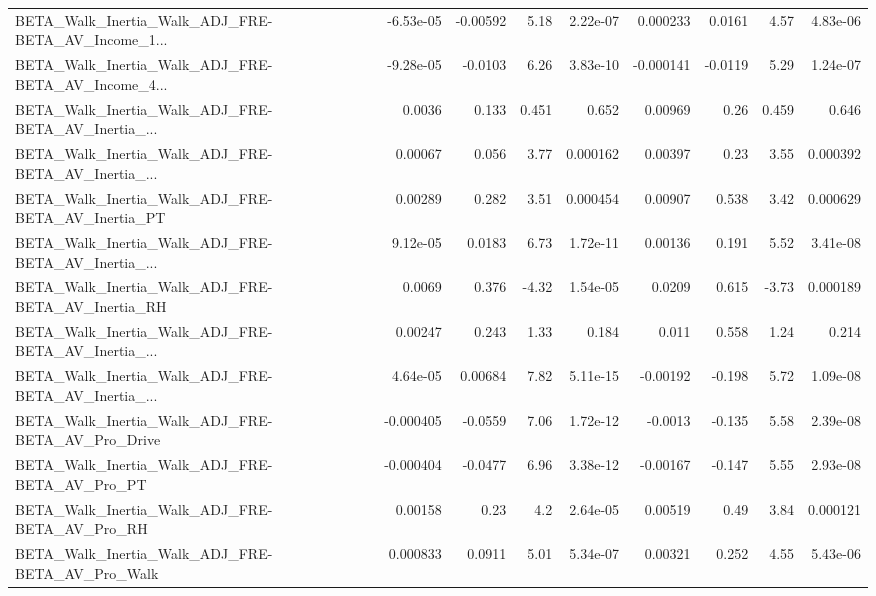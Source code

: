 \begin{tabular}{lrrrrrrrr}
BETA\_Walk\_Inertia\_Walk\_ADJ\_FRE-BETA\_AV\_Income\_1... &   -6.53e-05 &     -0.00592 &     5.18 & 2.22e-07 &   0.000233 &      0.0161 &         4.57 &      4.83e-06 \\
BETA\_Walk\_Inertia\_Walk\_ADJ\_FRE-BETA\_AV\_Income\_4... &   -9.28e-05 &      -0.0103 &     6.26 & 3.83e-10 &  -0.000141 &     -0.0119 &         5.29 &      1.24e-07 \\
BETA\_Walk\_Inertia\_Walk\_ADJ\_FRE-BETA\_AV\_Inertia\_... &      0.0036 &        0.133 &    0.451 &    0.652 &    0.00969 &        0.26 &        0.459 &         0.646 \\
BETA\_Walk\_Inertia\_Walk\_ADJ\_FRE-BETA\_AV\_Inertia\_... &     0.00067 &        0.056 &     3.77 & 0.000162 &    0.00397 &        0.23 &         3.55 &      0.000392 \\
BETA\_Walk\_Inertia\_Walk\_ADJ\_FRE-BETA\_AV\_Inertia\_PT  &     0.00289 &        0.282 &     3.51 & 0.000454 &    0.00907 &       0.538 &         3.42 &      0.000629 \\
BETA\_Walk\_Inertia\_Walk\_ADJ\_FRE-BETA\_AV\_Inertia\_... &    9.12e-05 &       0.0183 &     6.73 & 1.72e-11 &    0.00136 &       0.191 &         5.52 &      3.41e-08 \\
BETA\_Walk\_Inertia\_Walk\_ADJ\_FRE-BETA\_AV\_Inertia\_RH  &      0.0069 &        0.376 &    -4.32 & 1.54e-05 &     0.0209 &       0.615 &        -3.73 &      0.000189 \\
BETA\_Walk\_Inertia\_Walk\_ADJ\_FRE-BETA\_AV\_Inertia\_... &     0.00247 &        0.243 &     1.33 &    0.184 &      0.011 &       0.558 &         1.24 &         0.214 \\
BETA\_Walk\_Inertia\_Walk\_ADJ\_FRE-BETA\_AV\_Inertia\_... &    4.64e-05 &      0.00684 &     7.82 & 5.11e-15 &   -0.00192 &      -0.198 &         5.72 &      1.09e-08 \\
BETA\_Walk\_Inertia\_Walk\_ADJ\_FRE-BETA\_AV\_Pro\_Drive   &   -0.000405 &      -0.0559 &     7.06 & 1.72e-12 &    -0.0013 &      -0.135 &         5.58 &      2.39e-08 \\
BETA\_Walk\_Inertia\_Walk\_ADJ\_FRE-BETA\_AV\_Pro\_PT      &   -0.000404 &      -0.0477 &     6.96 & 3.38e-12 &   -0.00167 &      -0.147 &         5.55 &      2.93e-08 \\
BETA\_Walk\_Inertia\_Walk\_ADJ\_FRE-BETA\_AV\_Pro\_RH      &     0.00158 &         0.23 &      4.2 & 2.64e-05 &    0.00519 &        0.49 &         3.84 &      0.000121 \\
BETA\_Walk\_Inertia\_Walk\_ADJ\_FRE-BETA\_AV\_Pro\_Walk    &    0.000833 &       0.0911 &     5.01 & 5.34e-07 &    0.00321 &       0.252 &         4.55 &      5.43e-06 \\

\end{tabular}
